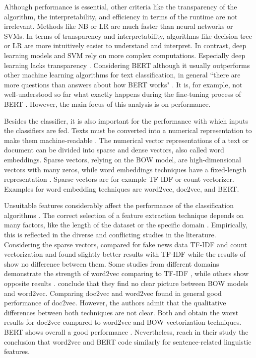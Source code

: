 \documentclass[12pt, a4paper, titlepage]{article}
\begin{document}
Although performance is essential, other criteria like the transparency of the algorithm, the interpretability, and efficiency in terms of the runtime are not irrelevant. Methods like \ac{NB} or \ac{LR} are much faster than neural networks or \ac{SVM}s. In terms of transparency and interpretability, algorithms like decision tree or \ac{LR} are more intuitively easier to understand and interpret. In contrast, deep learning models and \ac{SVM} rely on more complex computations. Especially deep learning lacks transparency \citep{maglogiannis2007}. Considering \ac{BERT} although it usually outperforms other machine learning algorithms for text classification, in general ``there are more questions than answers about how \ac{BERT} works" \citep[853]{rogers2020}. It is, for example, not well-understood so far what exactly happens during the fine-tuning process of \ac{BERT} \citep{merchant2020}. However, the main focus of this analysis is on performance. 

Besides the classifier, it is also important for the performance with which inputs the classifiers are fed. Texts must be converted into a numerical representation to make them machine-readable \citep{singh2019}. The numerical vector representations of a text or document can be divided into sparse and dense vectors, also called word embeddings. Sparse vectors, relying on the \ac{BOW} model, are high-dimensional vectors with many zeros, while word embeddings techniques have a fixed-length representation \citep{almeida2019}. Sparse vectors are for example \ac{TF-IDF} or count vectorizer. Examples for word embedding techniques are word2vec, doc2vec, and \ac{BERT}. 

Unsuitable features considerably affect the performance of the classification algorithms \citep{cahyani2021}. The correct selection of a feature extraction technique depends on many factors, like the length of the dataset or the specific domain \citep{arora2021}. Empirically, this is reflected in the diverse and conflicting studies in the literature. Considering the sparse vectors, \citet{wendland2021} compared for fake news data \ac{TF-IDF} and count vectorization and found slightly better results with \ac{TF-IDF} while the results of \citet{WangY2017} show no difference between them. Some studies from different domains demonstrate the strength of word2vec comparing to \ac{TF-IDF} \citep{arora2021, rahmawati2016}, while others show opposite results \citep{zhu2016,cahyani2021}. \citet{shao2018} conclude that they find no clear picture between \ac{BOW} models and word2vec. Comparing doc2vec and word2vec \citet{lau2016} found in general good performance of doc2vec. However, the authors admit that the qualitative differences between both techniques are not clear. Both \citet{shao2018} and \citet{WangY2017} obtain the worst results for doc2vec compared to word2vec and \ac{BOW} vectorization techniques. \ac{BERT} shows overall a good performance \citep{gonzalez2020}. Nevertheless, \citet{miaschi2020} reach in their study the conclusion that word2vec and \ac{BERT} code similarly for sentence-related linguistic features.  
\end{document}

